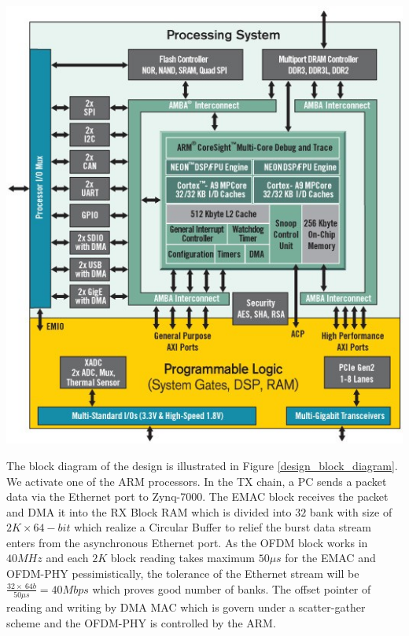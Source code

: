 \begin{center}
\includegraphics[width=\textwidth]{content/fig/zynq_inside.JPG}
\label{zynq_inside}
\end{center}

The block diagram of the design is illustrated in Figure \ref{design_block_diagram}. We activate one of the ARM processors. In the TX chain, a PC sends a packet data via the Ethernet port to Zynq-7000. The EMAC block receives the packet and DMA it into the RX Block RAM which is divided into $32$ bank with size of $2K \times 64-bit$ which realize a Circular Buffer to relief the burst data stream enters from the asynchronous Ethernet port. As the OFDM block works in $40 MHz$ and each $2K$ block reading takes maximum $50\mu s$ for the EMAC and OFDM-PHY pessimistically, the tolerance of the Ethernet stream will be $\frac{32 \times \ 64b}{50\mu s} = 40Mbps$ which proves good number of banks. The offset pointer of reading and writing by DMA MAC which is govern under a scatter-gather scheme and the OFDM-PHY is controlled by the ARM.\\

